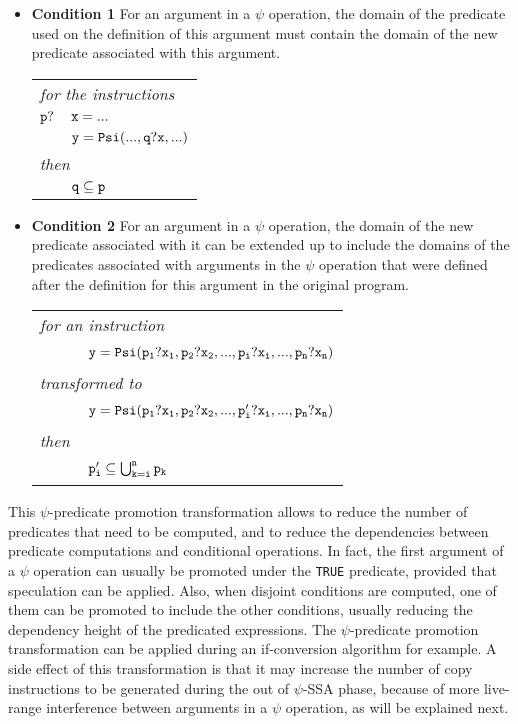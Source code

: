 \begin{itemize}

\item {\bf Condition 1} For an argument in a $\psi$ operation, the
domain of the predicate used on the definition of this argument must
contain the domain of the new predicate associated with this argument.

\begin{tabular}{ll}
\multicolumn{2}{l}{\it for the instructions}\\
${\tt p?}$ & ${\tt x = ...}$\\
& ${\tt y = Psi(..., q? x, ...)}$\\
\multicolumn{2}{l}{\it then}\\
& {${\tt q} \subseteq {\tt p}$}\\
\end{tabular}

\item {\bf Condition 2} For an argument in a $\psi$ operation, the
domain of the new predicate associated with it can be extended up to
include the domains of the predicates associated with arguments in the
$\psi$ operation that were defined after the definition for this
argument in the original program.

\begin{tabular}{ll}
\multicolumn{2}{l}{\it for an instruction} \\
\ \ \ \ & {$ {\tt y = Psi(p_1?x_1, p_2?x_2, ..., p_i?x_i, ..., p_n?x_n)}$} \\
\multicolumn{2}{l}{\it transformed to} \\
\ \ \ \ & {$ {\tt y = Psi(p_1?x_1, p_2?x_2, ..., p_i'?x_i, ..., p_n?x_n)}$} \\
\multicolumn{2}{l}{\it then} \\
\ \ \ \ & {${\tt p_i' \subseteq \bigcup_{k=i}^n p_k}$} \\
\end{tabular}

\end{itemize}

This $\psi$-predicate promotion transformation allows to reduce the
number of predicates that need to be computed, and to reduce the
dependencies between predicate computations and conditional
operations. In fact, the first argument of a $\psi$ operation can
usually be promoted under the {\tt TRUE} predicate, provided that
speculation can be applied. Also, when disjoint conditions are
computed, one of them can be promoted to include the other conditions,
usually reducing the dependency height of the predicated
expressions. The $\psi$-predicate promotion transformation can be
applied during an if-conversion algorithm for example. A side effect
of this transformation is that it may increase the number of copy
instructions to be generated during the out of $\psi$-SSA phase,
because of more live-range interference between arguments in a $\psi$
operation, as will be explained next.

